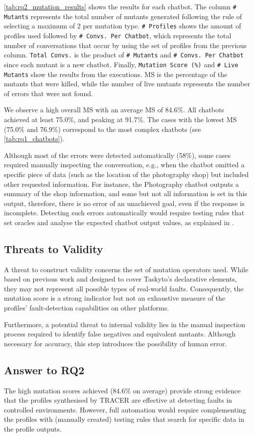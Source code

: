 \autoref{tab:rq2_mutation_results}
shows the results for each chatbot.
The column \texttt{\# Mutants} represents
the total number of mutants generated
following the rule of selecting a maximum of 2 per mutation type.
\texttt{\# Profiles} shows the amount of profiles used
followed by \texttt{\# Convs. Per Chatbot},
which represents the total number of conversations
that occur by using the set of profiles from the previous column.
\texttt{Total Convs.} is the product of
\texttt{\# Mutants} and \texttt{\# Convs. Per Chatbot}
since each mutant is a new chatbot.
Finally, \texttt{Mutation Score (\%)} and \texttt{\# Live Mutants}
show the results from the executions.
\ac{MS} is the percentage of the mutants that were killed,
while the number of live mutants
represents the number of errors that were not found.

We observe a high overall \acl{MS}
with an average \ac{MS} of 84.6\%.
All chatbots achieved at least 75.0\%,
and peaking at 91.7\%.
The cases with the lowest \ac{MS}
(75.0\% and 76.9\%)
correspond to the most complex chatbots
(see \autoref{tab:rq1_chatbots}).

Although most of the errors were detected automatically (58\%),
some cases required manually inspecting the conversation,
e.g., when the chatbot omitted a specific piece of data
(such as the location of the photography shop)
but included other requested information.
For instance, the Photography chatbot outputs a summary of the shop information,
and some but not all information is set in this output,
therefore, there is no error of an unachieved goal,
even if the response is incomplete.
Detecting such errors automatically
would require testing rules that set oracles
and analyse the expected chatbot output values,
as explained in \autocite{delaraSensei}.

\subsection{Threats to Validity}
A threat to construct validity
concerns the set of mutation operators used.
While based on previous work
and designed to cover Taskyto's declarative elements,
they may not represent
all possible types of real-world faults.
Consequently, the mutation score
is a strong indicator
but not an exhaustive measure
of the profiles' fault-detection capabilities on other platforms.

Furthermore,
a potential threat to internal validity
lies in the manual inspection process required
to identify false negatives and equivalent mutants.
Although necessary for accuracy,
this step introduces the possibility of human error.

\subsection{Answer to RQ2}

The high mutation scores achieved (84.6\% on average)
provide strong evidence
that the profiles synthesised by TRACER are effective
at detecting faults in controlled environments.
However, full automation would require
complementing the profiles with (manually created) testing rules
that search for specific data in the profile outputs.

